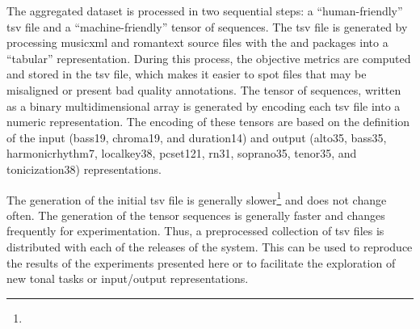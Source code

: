 
The aggregated dataset is processed in two sequential steps:
a ``human-friendly'' \gls{tsv} file and a
``machine-friendly'' tensor of sequences. The \gls{tsv} file
is generated by processing \gls{musicxml} and
\gls{romantext} source files with the 
\parencite{cuthbert2010music21} and 
\parencite{mckinney2011pandas} packages into a ``tabular''
representation. During this process, the objective metrics
are computed and stored in the \gls{tsv} file, which makes
it easier to spot files that may be misaligned or present
bad quality annotations. The tensor of sequences, written as
a binary  \parencite{oliphant2006guide}
multidimensional array is generated by encoding each
\gls{tsv} file into a numeric representation. The encoding
of these tensors are based on the definition of the input
(\gls{bass19}, \gls{chroma19}, and \gls{duration14}) and
output (\gls{alto35}, \gls{bass35}, \gls{harmonicrhythm7},
\gls{localkey38}, \gls{pcset121}, \gls{rn31},
\gls{soprano35}, \gls{tenor35}, and \gls{tonicization38})
representations.

The generation of the initial \gls{tsv} file is generally
slower\footnote{} and does
not change often. The generation of the tensor sequences is
generally faster and changes frequently for experimentation.
Thus, a preprocessed collection of \gls{tsv} files is
distributed with each of the releases of the system. This
can be used to reproduce the results of the experiments
presented here or to facilitate the exploration of new tonal
tasks or input/output representations.
